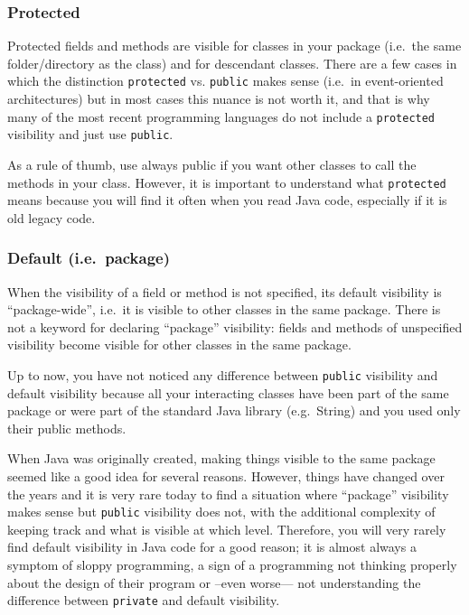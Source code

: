 {\subsubsection{Protected}
\label{sec:protected}

Protected fields and methods are visible for classes in your package
(i.e.~the same folder/directory as the class) and for descendant
classes. There are a few cases in which the distinction
\verb+protected+ vs. \verb+public+ makes sense (i.e.~in event-oriented
architectures) but in most cases this nuance is not worth it, and that
is why many of the most recent programming languages do not include a
\verb+protected+ visibility and just use \verb+public+. 

As a rule of thumb, use always public if you want other classes to
call the methods in your class. However, it is important to understand
what \verb+protected+ means because you will find it often when you
read Java code, especially if it is old legacy code. 

\subsubsection{Default (i.e.~package)}
\label{sec:default-i.e.-package}

When the visibility of a field or method is not specified, its default
visibility is ``package-wide'', i.e.~it is visible to other classes in
the same package. There is not a keyword for declaring ``package''
visibility: fields and methods of unspecified visibility become
visible for other classes in the same package. 

Up to now, you have not noticed any difference
between \verb+public+ visibility and default visibility because all
your interacting classes have been part of the same package or were
part of the standard Java library (e.g.~String) and you used only
their public methods. 

When Java was originally created, making things visible to the same
package seemed like a good idea for several reasons. However, things
have changed over the years and it is very rare today to find a
situation where ``package'' visibility makes sense but \verb+public+
visibility does not, with the additional complexity of keeping track
and what is visible at which level. Therefore, you will very rarely
find default visibility in Java code for a good reason; it is almost
always a symptom of sloppy programming, a sign of a programming not
thinking properly about the design of their program or --even worse---
not understanding the difference between \verb+private+ and default
visibility.   

}
